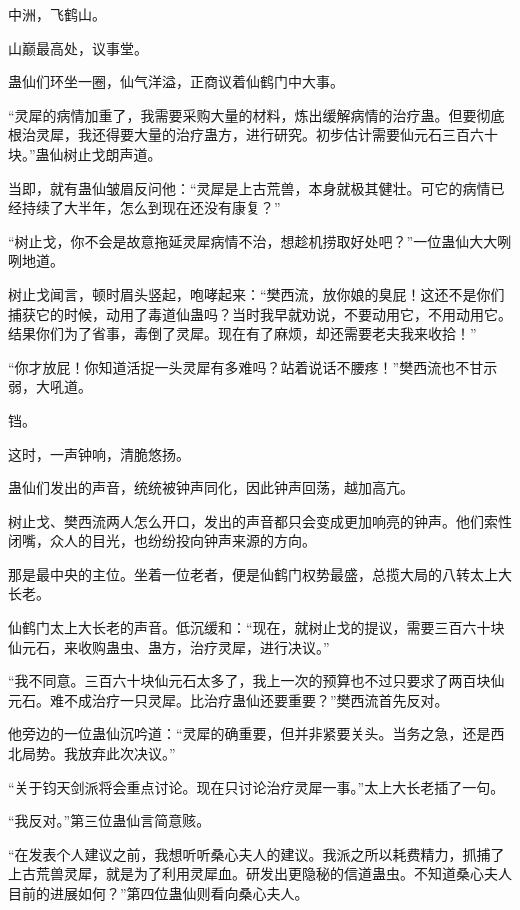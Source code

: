 
\begin{this_body}

中洲，飞鹤山。

山巅最高处，议事堂。

蛊仙们环坐一圈，仙气洋溢，正商议着仙鹤门中大事。

“灵犀的病情加重了，我需要采购大量的材料，炼出缓解病情的治疗蛊。但要彻底根治灵犀，我还得要大量的治疗蛊方，进行研究。初步估计需要仙元石三百六十块。”蛊仙树止戈朗声道。

当即，就有蛊仙皱眉反问他：“灵犀是上古荒兽，本身就极其健壮。可它的病情已经持续了大半年，怎么到现在还没有康复？”

“树止戈，你不会是故意拖延灵犀病情不治，想趁机捞取好处吧？”一位蛊仙大大咧咧地道。

树止戈闻言，顿时眉头竖起，咆哮起来：“樊西流，放你娘的臭屁！这还不是你们捕获它的时候，动用了毒道仙蛊吗？当时我早就劝说，不要动用它，不用动用它。结果你们为了省事，毒倒了灵犀。现在有了麻烦，却还需要老夫我来收拾！”

“你才放屁！你知道活捉一头灵犀有多难吗？站着说话不腰疼！”樊西流也不甘示弱，大吼道。

铛。

这时，一声钟响，清脆悠扬。

蛊仙们发出的声音，统统被钟声同化，因此钟声回荡，越加高亢。

树止戈、樊西流两人怎么开口，发出的声音都只会变成更加响亮的钟声。他们索性闭嘴，众人的目光，也纷纷投向钟声来源的方向。

那是最中央的主位。坐着一位老者，便是仙鹤门权势最盛，总揽大局的八转太上大长老。

仙鹤门太上大长老的声音。低沉缓和：“现在，就树止戈的提议，需要三百六十块仙元石，来收购蛊虫、蛊方，治疗灵犀，进行决议。”

“我不同意。三百六十块仙元石太多了，我上一次的预算也不过只要求了两百块仙元石。难不成治疗一只灵犀。比治疗蛊仙还要重要？”樊西流首先反对。

他旁边的一位蛊仙沉吟道：“灵犀的确重要，但并非紧要关头。当务之急，还是西北局势。我放弃此次决议。”

“关于钧天剑派将会重点讨论。现在只讨论治疗灵犀一事。”太上大长老插了一句。

“我反对。”第三位蛊仙言简意赅。

“在发表个人建议之前，我想听听桑心夫人的建议。我派之所以耗费精力，抓捕了上古荒兽灵犀，就是为了利用灵犀血。研发出更隐秘的信道蛊虫。不知道桑心夫人目前的进展如何？”第四位蛊仙则看向桑心夫人。


\end{this_body}
